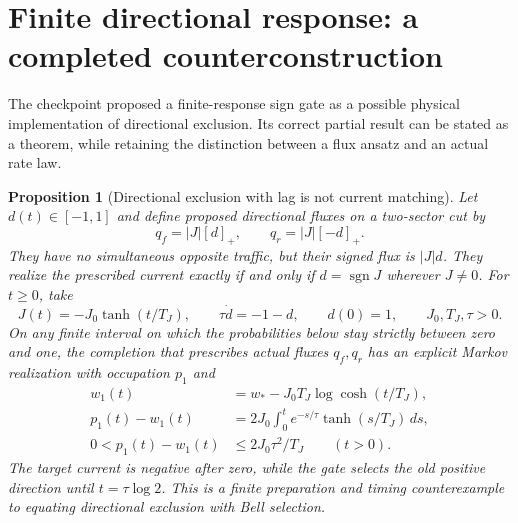 \documentclass[11pt,oneside,openany]{book}
\newtheorem{proposition}[theorem]{Proposition}
\theoremstyle{definition}
\theoremstyle{remark}\newtheorem{remark}[theorem]{Remark}
\begin{document}
\section{Finite directional response: a completed counterconstruction}

The checkpoint proposed a finite-response sign gate as a possible physical
implementation of directional exclusion. Its correct partial result can
be stated as a theorem, while retaining the distinction between a flux
ansatz and an actual rate law.

\begin{proposition}[Directional exclusion with lag is not current matching]
\label{stat:gate}
Let $d(t)\in[-1,1]$ and define proposed directional fluxes on a two-sector
cut by
\begin{equation}\label{stat:gate-flux}
 q_f=|J|[d]_+,\qquad q_r=|J|[-d]_+.
\end{equation}
They have no simultaneous opposite traffic, but their signed flux is
$|J|d$. They realize the prescribed current exactly if and only if
$d=\operatorname{sgn}J$ wherever $J\ne0$.
For $t\geq0$, take
\[
 J(t)=-J_0\tanh(t/T_J),\qquad
 \tau\dot d=-1-d,\qquad d(0)=1,
 \qquad J_0,T_J,\tau>0.
\]
On any finite interval on which the probabilities below stay strictly
between zero and one, the completion that prescribes \emph{actual}
fluxes $q_f,q_r$ has an explicit Markov realization with occupation $p_1$
and
\begin{align}
 w_1(t)&=w_*-J_0T_J\log\cosh(t/T_J),\label{stat:gate-wave}\\
 p_1(t)-w_1(t)
    &=2J_0\int_0^t e^{-s/\tau}\tanh(s/T_J)\,ds,
                                                  \label{stat:gate-error}\\
 0<p_1(t)-w_1(t)&\leq2J_0\tau^2/T_J\qquad(t>0).
                                                  \label{stat:gate-bound}
\end{align}
The target current is negative after zero, while the gate selects the old
positive direction until $t=\tau\log2$. This is a finite preparation and
timing counterexample to equating directional exclusion with Bell selection.
\end{proposition}
\end{document}
